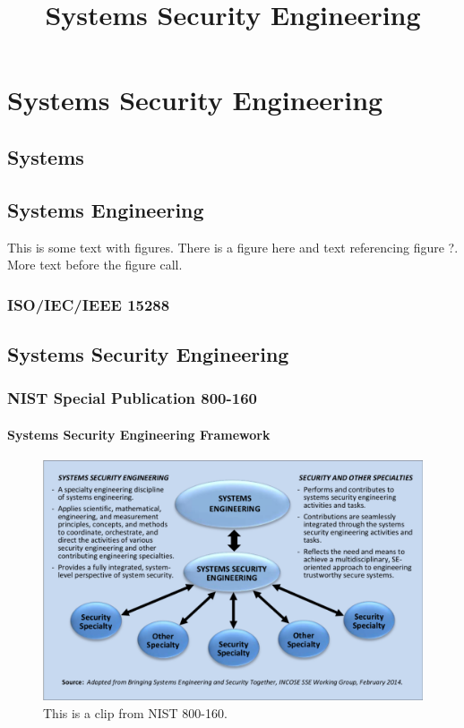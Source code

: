 \documentclass[../../main/main.tex]{subfiles}
\begin{document}
\title{Systems Security Engineering}


\chapter{Systems Security Engineering}\label{chp:sse}


\section{Systems}\label{sec:systems}

\section{Systems Engineering}\label{sec:se}
This is some text with figures.  There is a figure here and text referencing figure ?.  More text before the figure call.

\subsection{ISO/IEC/IEEE 15288}\label{ssec:isoiecieee}

\section{Systems Security Engineering}\label{sec:sse}

\subsection{NIST Special Publication 800-160}\label{ssec:nist800600}

\subsubsection{Systems Security Engineering Framework}\label{sssec:sseframework}

\begin{figure}[ht]
\includegraphics[width=\linewidth]{../figures/seincontext.png}
\caption{This is a clip from NIST 800-160.}
\label{fig:nist800160}
\end{figure}
\end{document}
